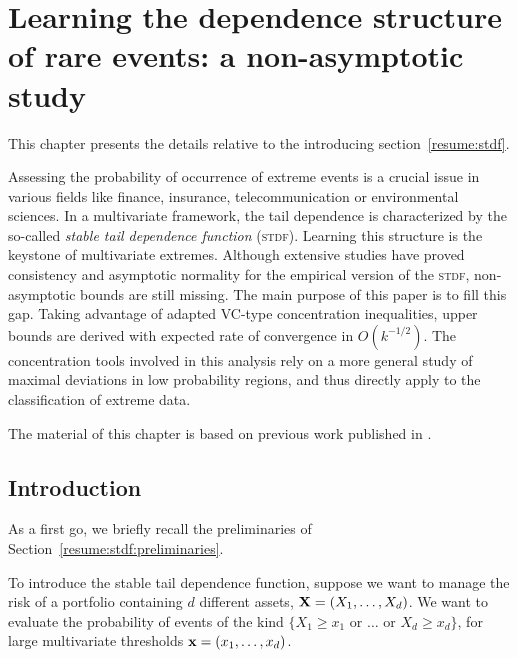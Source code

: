 \chapter{Learning the dependence structure of rare events:
a non-asymptotic study}
\label{colt}

\begin{chapabstract}
This chapter presents the details relative to the introducing section~\ref{resume:stdf}.

Assessing the probability of occurrence of extreme events is a crucial issue in various fields like finance, insurance, telecommunication or environmental sciences. In a multivariate framework, the tail dependence is characterized by the so-called \emph{stable tail dependence function} (\textsc{stdf}). Learning this structure is the keystone of multivariate extremes. Although extensive studies have proved consistency and asymptotic normality for the empirical version of the \textsc{stdf}, non-asymptotic bounds are still missing. The main purpose of this paper is to fill this gap. Taking advantage of adapted VC-type concentration inequalities, upper bounds are derived with expected rate of convergence in $O(k^{-1/2})$. The concentration tools involved in this analysis rely on a more general study of maximal deviations in low probability regions, and thus directly apply to the classification of extreme data.

The material of this chapter is based on previous work published in \cite{COLT15}.
\end{chapabstract}


\section{Introduction}
\label{colt:sec:intro}

As a first go, we briefly recall the preliminaries of Section~\ref{resume:stdf:preliminaries}.

To introduce the stable tail dependence function,  suppose we want to manage the risk of a
  portfolio  containing $d$ different assets,  $\mathbf
X = (X_1,\ldots,X_d)$.
We want to evaluate  the
probability of events of the kind 
$\{X_1 \ge x_1 \text{ or }  \dotsc \text{ or }
X_d\ge x_d \}$, for large multivariate thresholds $\mathbf
x=(x_1,\ldots,x_d)$.  
 
